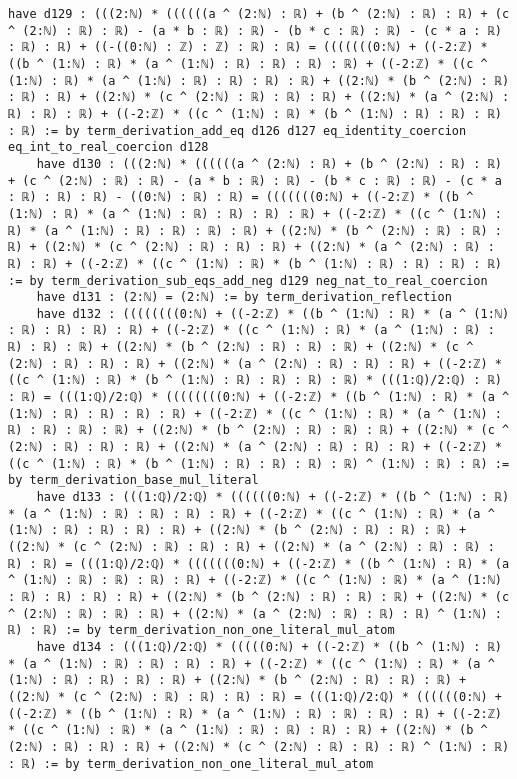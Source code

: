 \documentclass{article}
\begin{document}
\begin{tcolorbox}[colback=white!10, width=\linewidth]
\begin{lstlisting}[language=Lean4]
    have d129 : (((2:ℕ) * ((((((a ^ (2:ℕ) : ℝ) + (b ^ (2:ℕ) : ℝ) : ℝ) + (c ^ (2:ℕ) : ℝ) : ℝ) - (a * b : ℝ) : ℝ) - (b * c : ℝ) : ℝ) - (c * a : ℝ) : ℝ) : ℝ) + ((-((0:ℕ) : ℤ) : ℤ) : ℝ) : ℝ) = (((((((0:ℕ) + ((-2:ℤ) * ((b ^ (1:ℕ) : ℝ) * (a ^ (1:ℕ) : ℝ) : ℝ) : ℝ) : ℝ) + ((-2:ℤ) * ((c ^ (1:ℕ) : ℝ) * (a ^ (1:ℕ) : ℝ) : ℝ) : ℝ) : ℝ) + ((2:ℕ) * (b ^ (2:ℕ) : ℝ) : ℝ) : ℝ) + ((2:ℕ) * (c ^ (2:ℕ) : ℝ) : ℝ) : ℝ) + ((2:ℕ) * (a ^ (2:ℕ) : ℝ) : ℝ) : ℝ) + ((-2:ℤ) * ((c ^ (1:ℕ) : ℝ) * (b ^ (1:ℕ) : ℝ) : ℝ) : ℝ) : ℝ) := by term_derivation_add_eq d126 d127 eq_identity_coercion eq_int_to_real_coercion d128
    have d130 : (((2:ℕ) * ((((((a ^ (2:ℕ) : ℝ) + (b ^ (2:ℕ) : ℝ) : ℝ) + (c ^ (2:ℕ) : ℝ) : ℝ) - (a * b : ℝ) : ℝ) - (b * c : ℝ) : ℝ) - (c * a : ℝ) : ℝ) : ℝ) - ((0:ℕ) : ℝ) : ℝ) = (((((((0:ℕ) + ((-2:ℤ) * ((b ^ (1:ℕ) : ℝ) * (a ^ (1:ℕ) : ℝ) : ℝ) : ℝ) : ℝ) + ((-2:ℤ) * ((c ^ (1:ℕ) : ℝ) * (a ^ (1:ℕ) : ℝ) : ℝ) : ℝ) : ℝ) + ((2:ℕ) * (b ^ (2:ℕ) : ℝ) : ℝ) : ℝ) + ((2:ℕ) * (c ^ (2:ℕ) : ℝ) : ℝ) : ℝ) + ((2:ℕ) * (a ^ (2:ℕ) : ℝ) : ℝ) : ℝ) + ((-2:ℤ) * ((c ^ (1:ℕ) : ℝ) * (b ^ (1:ℕ) : ℝ) : ℝ) : ℝ) : ℝ) := by term_derivation_sub_eqs_add_neg d129 neg_nat_to_real_coercion
    have d131 : (2:ℕ) = (2:ℕ) := by term_derivation_reflection
    have d132 : ((((((((0:ℕ) + ((-2:ℤ) * ((b ^ (1:ℕ) : ℝ) * (a ^ (1:ℕ) : ℝ) : ℝ) : ℝ) : ℝ) + ((-2:ℤ) * ((c ^ (1:ℕ) : ℝ) * (a ^ (1:ℕ) : ℝ) : ℝ) : ℝ) : ℝ) + ((2:ℕ) * (b ^ (2:ℕ) : ℝ) : ℝ) : ℝ) + ((2:ℕ) * (c ^ (2:ℕ) : ℝ) : ℝ) : ℝ) + ((2:ℕ) * (a ^ (2:ℕ) : ℝ) : ℝ) : ℝ) + ((-2:ℤ) * ((c ^ (1:ℕ) : ℝ) * (b ^ (1:ℕ) : ℝ) : ℝ) : ℝ) : ℝ) * (((1:ℚ)/2:ℚ) : ℝ) : ℝ) = (((1:ℚ)/2:ℚ) * ((((((((0:ℕ) + ((-2:ℤ) * ((b ^ (1:ℕ) : ℝ) * (a ^ (1:ℕ) : ℝ) : ℝ) : ℝ) : ℝ) + ((-2:ℤ) * ((c ^ (1:ℕ) : ℝ) * (a ^ (1:ℕ) : ℝ) : ℝ) : ℝ) : ℝ) + ((2:ℕ) * (b ^ (2:ℕ) : ℝ) : ℝ) : ℝ) + ((2:ℕ) * (c ^ (2:ℕ) : ℝ) : ℝ) : ℝ) + ((2:ℕ) * (a ^ (2:ℕ) : ℝ) : ℝ) : ℝ) + ((-2:ℤ) * ((c ^ (1:ℕ) : ℝ) * (b ^ (1:ℕ) : ℝ) : ℝ) : ℝ) : ℝ) ^ (1:ℕ) : ℝ) : ℝ) := by term_derivation_base_mul_literal
    have d133 : (((1:ℚ)/2:ℚ) * ((((((0:ℕ) + ((-2:ℤ) * ((b ^ (1:ℕ) : ℝ) * (a ^ (1:ℕ) : ℝ) : ℝ) : ℝ) : ℝ) + ((-2:ℤ) * ((c ^ (1:ℕ) : ℝ) * (a ^ (1:ℕ) : ℝ) : ℝ) : ℝ) : ℝ) + ((2:ℕ) * (b ^ (2:ℕ) : ℝ) : ℝ) : ℝ) + ((2:ℕ) * (c ^ (2:ℕ) : ℝ) : ℝ) : ℝ) + ((2:ℕ) * (a ^ (2:ℕ) : ℝ) : ℝ) : ℝ) : ℝ) = (((1:ℚ)/2:ℚ) * (((((((0:ℕ) + ((-2:ℤ) * ((b ^ (1:ℕ) : ℝ) * (a ^ (1:ℕ) : ℝ) : ℝ) : ℝ) : ℝ) + ((-2:ℤ) * ((c ^ (1:ℕ) : ℝ) * (a ^ (1:ℕ) : ℝ) : ℝ) : ℝ) : ℝ) + ((2:ℕ) * (b ^ (2:ℕ) : ℝ) : ℝ) : ℝ) + ((2:ℕ) * (c ^ (2:ℕ) : ℝ) : ℝ) : ℝ) + ((2:ℕ) * (a ^ (2:ℕ) : ℝ) : ℝ) : ℝ) ^ (1:ℕ) : ℝ) : ℝ) := by term_derivation_non_one_literal_mul_atom
    have d134 : (((1:ℚ)/2:ℚ) * (((((0:ℕ) + ((-2:ℤ) * ((b ^ (1:ℕ) : ℝ) * (a ^ (1:ℕ) : ℝ) : ℝ) : ℝ) : ℝ) + ((-2:ℤ) * ((c ^ (1:ℕ) : ℝ) * (a ^ (1:ℕ) : ℝ) : ℝ) : ℝ) : ℝ) + ((2:ℕ) * (b ^ (2:ℕ) : ℝ) : ℝ) : ℝ) + ((2:ℕ) * (c ^ (2:ℕ) : ℝ) : ℝ) : ℝ) : ℝ) = (((1:ℚ)/2:ℚ) * ((((((0:ℕ) + ((-2:ℤ) * ((b ^ (1:ℕ) : ℝ) * (a ^ (1:ℕ) : ℝ) : ℝ) : ℝ) : ℝ) + ((-2:ℤ) * ((c ^ (1:ℕ) : ℝ) * (a ^ (1:ℕ) : ℝ) : ℝ) : ℝ) : ℝ) + ((2:ℕ) * (b ^ (2:ℕ) : ℝ) : ℝ) : ℝ) + ((2:ℕ) * (c ^ (2:ℕ) : ℝ) : ℝ) : ℝ) ^ (1:ℕ) : ℝ) : ℝ) := by term_derivation_non_one_literal_mul_atom

\end{lstlisting}
\end{tcolorbox}
\end{document}
